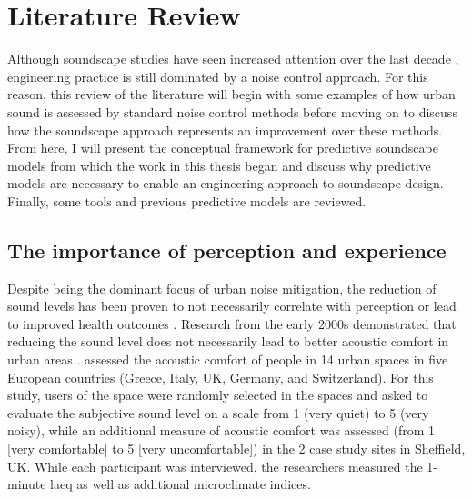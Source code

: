 \chapter{Literature Review}
\label{ch:lit}

Although soundscape studies have seen increased attention over the last decade \citep{Kang2016Ten}, engineering practice is still dominated by a noise control approach. For this reason, this review of the literature will begin with some examples of how urban sound is assessed by standard noise control methods before moving on to discuss how the soundscape approach represents an improvement over these methods. From here, I will present the conceptual framework for predictive soundscape models \citep{Aletta2016Soundscape} from which the work in this thesis began and discuss why predictive models are necessary to enable an engineering approach to soundscape design. Finally, some tools and previous predictive models are reviewed.

\section{The importance of perception and experience}
Despite being the dominant focus of urban noise mitigation, the reduction of sound levels has been proven to not necessarily correlate with perception or lead to improved health outcomes \citep{Kang2006Urban,Andringa2013Positioning,Kempen2014Characterizing,Asdrubali2014New,Kang2016Ten}. Research from the early 2000s demonstrated that reducing the sound level does not necessarily lead to better acoustic comfort in urban areas \citep{DeRuiter2000Noise,SchulteFortkamp2001Quality}. \citet{Yang2005Acoustic} assessed the acoustic comfort of people in 14 urban spaces in five European countries (Greece, Italy, UK, Germany, and Switzerland). For this study, users of the space were randomly selected in the spaces and asked to evaluate the subjective sound level on a scale from 1 (very quiet) to 5 (very noisy), while an additional measure of acoustic comfort was assessed (from 1 [very comfortable] to 5 [very uncomfortable]) in the 2 case study sites in Sheffield, UK. While each participant was interviewed, the researchers measured the 1-minute \gls{laeq} as well as additional microclimate indices. 

